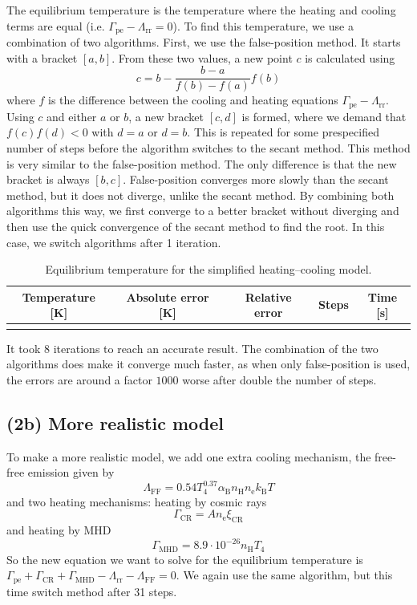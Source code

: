 \documentclass{article}
\newcommand{\CalcDir}{Calculations}
\begin{document}
The equilibrium temperature is the temperature where the heating and cooling terms are equal (i.e. $\Gamma_\mathrm{pe}-\Lambda_\mathrm{rr}=0$). To find this temperature, we use a combination of two algorithms. First, we use the false-position method.  It starts with a bracket $[a, b]$. From these two values, a new point $c$ is calculated using 
\begin{equation}
    c = b - \frac{b-a}{f(b)-f(a)}f(b)
\end{equation}
where $f$ is the difference between the cooling and heating equations $\Gamma_\mathrm{pe}-\Lambda_\mathrm{rr}$. Using $c$ and either $a$ or $b$, a new bracket $[c, d]$ is formed, where we demand that $f(c)f(d)<0$ with $d=a$ or $d=b$. This is repeated for some prespecified number of steps before the algorithm switches to the secant method. This method is very similar to the false-position method. The only difference is that the new bracket is always $[b, c]$. False-position converges more slowly than the secant method, but it does not diverge, unlike the secant method. By combining both algorithms this way, we first converge to a better bracket without diverging and then use the quick convergence of the secant method to find the root.
In this case, we switch algorithms after 1 iteration. 
\begin{table}[H]
\centering
\caption{Equilibrium temperature for the simplified heating–cooling model.}
\begin{tabular}{|c|c|c|c|c|}
\hline
Temperature [K] & Absolute error [K] & Relative error & Steps & Time [s]\\
\hline

\\
\hline
\end{tabular}
\end{table}

It took 8 iterations to reach an accurate result. The combination of the two algorithms does make it converge much faster, as when only false-position is used, the errors are around a factor $1000$ worse after double the number of steps. 

\subsection{(2b) More realistic model}
To make a more realistic model, we add one extra cooling mechanism, the free-free emission given by
\begin{equation}
    \Lambda_\mathrm{FF} = 0.54T_4^{0.37}\alpha_\mathrm{B}n_\mathrm{H}n_\mathrm{e}k_\mathrm{B}T
\end{equation}
and two heating mechanisms: heating by cosmic rays
\begin{equation}
    \Gamma_\mathrm{CR}=An_\mathrm{e}\xi_\mathrm{CR}
\end{equation}
and heating by MHD
\begin{equation}
    \Gamma_\mathrm{MHD}=8.9\cdot10^{-26}n_\mathrm{H}T_4
\end{equation}
So the new equation we want to solve for the equilibrium temperature is $\Gamma_\mathrm{pe} + \Gamma_\mathrm{CR} + \Gamma_\mathrm{MHD} -\Lambda_\mathrm{rr} - \Lambda_\mathrm{FF}=0$. We again use the same algorithm, but this time switch method after 31 steps. 
\end{document}
